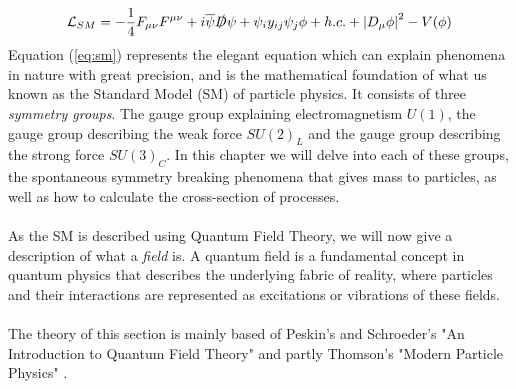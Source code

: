 \documentclass[12pt, a4paper]{book}
\begin{document}
\begin{equation}\label{eq:sm}
    \mathcal{L}_{SM} = -\frac{1}{4}F_{\mu\nu}F^{\mu\nu} + i\overline{\psi}\slashed{D}\psi + \psi_iy_{ij}\psi_j\phi + h.c. + \abs{D_\mu\phi}^2 - V(\phi)
\end{equation}
Equation (\ref{eq:sm}) represents the elegant equation which can explain phenomena in nature with great precision, and is the mathematical foundation of what us known as the Standard Model (SM) of particle physics. 
It consists of three \textit{symmetry groups}. The gauge group explaining electromagnetism $U(1)$, the gauge group describing the weak force $SU(2)_L$ and the gauge group describing the strong force $SU(3)_C$. 
In this chapter we will delve into each of these groups, the spontaneous symmetry breaking phenomena that gives mass to particles, as well as how to calculate the cross-section of processes.\\
\\As the SM is described using Quantum Field Theory, we will now give a description of what a \textit{field} is. A quantum field is a fundamental concept in quantum physics that describes the underlying fabric of reality, 
where particles and their interactions are represented as excitations or vibrations of these fields.\\
\\The theory of this section is mainly based of Peskin's and Schroeder's "An Introduction to Quantum Field Theory" \cite{Peskin:1995ev} and partly Thomson's "Modern Particle Physics" \cite{THOMSON}.

\clearpage
\end{document}
